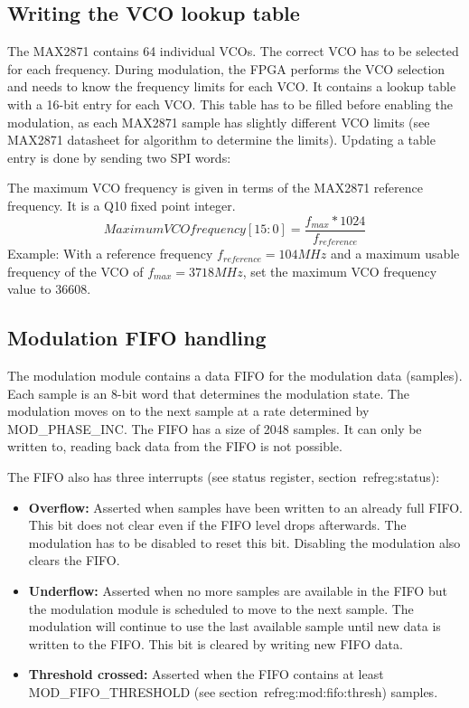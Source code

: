 \documentclass{article}
\newcommand{\bitrect}[2]{
  \begin{pgfonlayer}{foreground}
    \draw [thick] (0,0) rectangle (#1,1);
    \pgfmathsetmacro\result{#1-1}
    \foreach \x in {1,...,\result}
      \draw [thick] (\x,1) -- (\x, 0.8);
  \end{pgfonlayer}
  \bitlabels{#1}{#2}
}
\newcommand{\rwbits}[3]{
  \draw [thick] (#1,0) rectangle ++(#2,1) node[pos=0.5]{#3};
  \pgfmathsetmacro\start{#1+0.5}
  \pgfmathsetmacro\finish{#1+#2-0.5}
}
\newcommand{\robits}[3]{
  \begin{pgfonlayer}{background}
    \draw [thick, fill=lightgray] (#1,0) rectangle ++(#2,1) node[pos=0.5]{#3};
  \end{pgfonlayer}
  \pgfmathsetmacro\start{#1+0.5}
  \pgfmathsetmacro\finish{#1+#2-0.5}
}
\newcommand{\bitlabels}[2]{
  \foreach \bit in {1,...,#1}{
     \pgfmathsetmacro\result{#2}
     \node [above] at (\bit-0.5, 1) {\pgfmathprintnumber{\result}};
   }
}
\begin{document}
\subsection{Writing the VCO lookup table}
The MAX2871 contains 64 individual VCOs. The correct VCO has to be selected for each frequency. During modulation, the FPGA performs the VCO selection and needs to know the frequency limits for each VCO. It contains a lookup table with a 16-bit entry for each VCO. This table has to be filled before enabling the modulation, as each MAX2871 sample has slightly different VCO limits (see MAX2871 datasheet for algorithm to determine the limits).
Updating a table entry is done by sending two SPI words:
\begin{center}
\end{center}
The maximum VCO frequency is given in terms of the MAX2871 reference frequency. It is a Q10 fixed point integer.
$$
Maximum VCO frequency[15:0] = \frac{f_{max} * 1024}{f_{reference}}
$$
Example: With a reference frequency $f_{reference} = 104 MHz$ and a maximum usable frequency of the VCO of $f_{max} = 3718 MHz$, set the maximum VCO frequency value to 36608.

\subsection{Modulation FIFO handling}
\label{mod:fifo}
The modulation module contains a data FIFO for the modulation data (samples). Each sample is an 8-bit word that determines the modulation state. The modulation moves on to the next sample at a rate determined by MOD\_PHASE\_INC. The FIFO has a size of 2048 samples. It can only be written to, reading back data from the FIFO is not possible.

The FIFO also has three interrupts (see status register, section~ref{reg:status}):
\begin{itemize}
\item \textbf{Overflow:} Asserted when samples have been written to an already full FIFO. This bit does not clear even if the FIFO level drops afterwards. The modulation has to be disabled to reset this bit. Disabling the modulation also clears the FIFO.
\item \textbf{Underflow:} Asserted when no more samples are available in the FIFO but the modulation module is scheduled to move to the next sample. The modulation will continue to use the last available sample until new data is written to the FIFO. This bit is cleared by writing new FIFO data.
\item \textbf{Threshold crossed:} Asserted when the FIFO contains at least MOD\_FIFO\_THRESHOLD (see section~ref{reg:mod:fifo:thresh}) samples.
\end{itemize}
\end{document}
